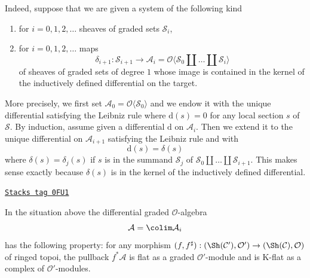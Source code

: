 \medskip\noindent
Indeed, suppose that we are given a system of the following kind
\begin{enumerate}
\item for $i = 0, 1, 2, \ldots$ sheaves of graded sets $\mathcal{S}_i$,
\item for $i = 0, 1, 2, \ldots$ maps
$$
\delta_{i + 1} : \mathcal{S}_{i + 1}
\longrightarrow
\mathcal{A}_i =
\mathcal{O}\langle \mathcal{S}_0 \amalg \ldots \amalg \mathcal{S}_i\rangle
$$
of sheaves of graded sets of degree $1$ whose image is contained
in the kernel of the inductively defined differential on the target.
\end{enumerate}
More precisely, we first set
$\mathcal{A}_0 = \mathcal{O}\langle \mathcal{S}_0 \rangle$
and we endow it with the unique differential satisfying the Leibniz rule
where $\text{d}(s) = 0$ for any local section $s$ of $\mathcal{S}$.
By induction, assume given a differential $\text{d}$
on $\mathcal{A}_i$. Then we extend it to the unique
differential on $\mathcal{A}_{i + 1}$ satisfying the Leibniz rule and
with
$$
\text{d}(s) = \delta(s)
$$
where $\delta(s) = \delta_j(s)$ if $s$ is in the summand $\mathcal{S}_j$ of
$\mathcal{S}_0 \amalg \ldots \amalg \mathcal{S}_{i + 1}$.
This makes sense exactly because $\delta(s)$ is in the kernel
of the inductively defined differential.

\begin{lemma}
\label{sdga-lemma-special-good}
\href{https://stacks.math.columbia.edu/tag/0FU1}{\texttt{Stacks tag 0FU1}}

In the situation above the differential graded $\mathcal{O}$-algebra
$$
\mathcal{A} = \colim \mathcal{A}_i
$$
has the following property: for any morphism
$(f, f^\sharp) : (\Sh(\mathcal{C}'), \mathcal{O}')
\to (\Sh(\mathcal{C}), \mathcal{O})$
of ringed topoi, the pullback $f^*\mathcal{A}$
is flat as a graded $\mathcal{O}'$-module and
is K-flat as a complex of $\mathcal{O}'$-modules.
\end{lemma}

